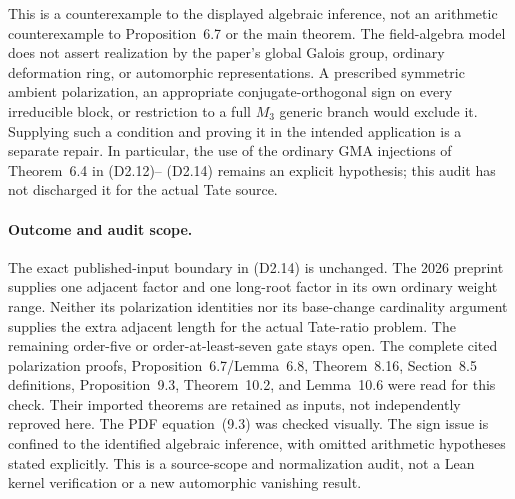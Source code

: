 This is a counterexample to the displayed algebraic inference,
not an arithmetic counterexample to Proposition~6.7 or the main
theorem.  The field-algebra model does not assert realization by
the paper's global Galois group, ordinary deformation ring, or
automorphic representations.  A prescribed symmetric ambient
polarization, an appropriate conjugate-orthogonal sign on every
irreducible block, or restriction to a full $M_3$ generic branch
would exclude it.  Supplying such a condition and proving it in
the intended application is a separate repair.  In particular,
the use of the ordinary GMA injections of Theorem~6.4 in (D2.12)--
(D2.14) remains an explicit hypothesis; this audit has not
discharged it for the actual Tate source.

\paragraph{Outcome and audit scope.}
The exact published-input boundary in (D2.14) is unchanged.
The 2026 preprint supplies one adjacent factor and one long-root
factor in its own ordinary weight range.  Neither its polarization
identities nor its base-change cardinality argument supplies the
extra adjacent length for the actual Tate-ratio problem.  The
remaining order-five or order-at-least-seven gate stays open.
The complete cited polarization proofs, Proposition~6.7/Lemma~6.8,
Theorem~8.16, Section~8.5 definitions, Proposition~9.3,
Theorem~10.2, and Lemma~10.6 were read for this check.  Their imported
theorems are retained as inputs, not independently reproved here.
The PDF equation~(9.3) was checked visually.  The sign issue is
confined to the identified algebraic inference, with omitted
arithmetic hypotheses stated explicitly.  This is a source-scope
and normalization audit, not a Lean kernel verification or a new
automorphic vanishing result.
